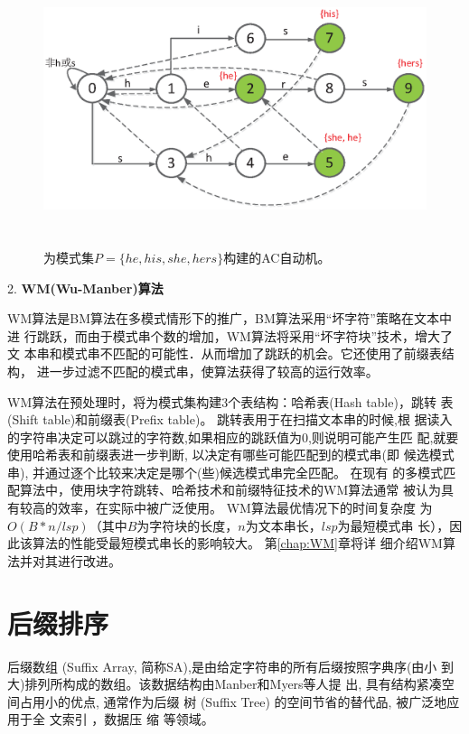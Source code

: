 \begin{figure}[H]
  \centering
  \includegraphics[height=8cm ,width=12cm]{figures/1_Introduction/AC.eps}
  \caption{为模式集$P=\{he, his, she, hers\}$构建的AC自动机。}
  \label{fig:AC}
\end{figure}

2. \textbf{WM(Wu-Manber)算法}

WM算法是BM算法在多模式情形下的推广，BM算法采用“坏字符”策略在文本中进
行跳跃，而由于模式串个数的增加，WM算法将采用“坏字符块”技术，增大了文
本串和模式串不匹配的可能性．从而增加了跳跃的机会。它还使用了前缀表结构，
进一步过滤不匹配的模式串，使算法获得了较高的运行效率。

WM算法在预处理时，将为模式集构建3个表结构：哈希表(Hash table)，跳转
表(Shift table)和前缀表(Prefix table)。 跳转表用于在扫描文本串的时候,根
据读入的字符串决定可以跳过的字符数,如果相应的跳跃值为0,则说明可能产生匹
配,就要使用哈希表和前缀表进一步判断, 以决定有哪些可能匹配到的模式串(即
候选模式串), 并通过逐个比较来决定是哪个(些)候选模式串完全匹配。 在现有
的多模式匹配算法中，使用块字符跳转、哈希技术和前缀特征技术的WM算法通常
被认为具有较高的效率，在实际中被广泛使用。 WM算法最优情况下的时间复杂度
为$O(B*n/lsp)$（其中$B$为字符块的长度，$n$为文本串长，$lsp$为最短模式串
长），因此该算法的性能受最短模式串长的影响较大。 第\ref{chap:WM}章将详
细介绍WM算法并对其进行改进。

\section{后缀排序}

后缀数组 (Suffix Array, 简称SA),是由给定字符串的所有后缀按照字典序(由小
到大)排列所构成的数组。该数据结构由Manber和Myers等人提
出\cite{Manber1993}, 具有结构紧凑空间占用小的优点, 通常作为后缀
树 (Suffix Tree)\cite{Weiner1973} 的空间节省的替代品, 被广泛地应用于全
文索引 \cite{Strate2015,Fischer2017,Arroyuelo2014}，数据压
缩\cite{Louza2015,Chien2015,Pradhan2016,Brisaboa2015} 等领域。

